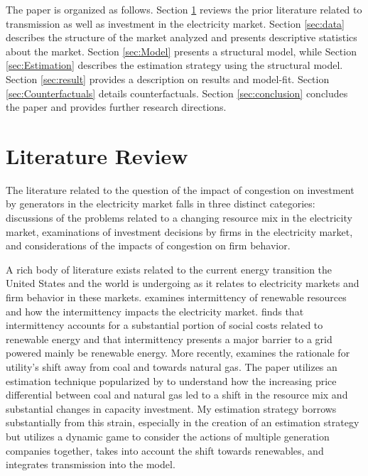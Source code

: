 \documentclass[12pt]{article}
\begin{document}
 The paper is organized as follows. Section \ref{sec:literature} reviews the prior literature related to transmission as well as investment in the electricity market. Section \ref{sec:data} describes the structure of the market analyzed and presents descriptive statistics about the market. Section \ref{sec:Model} presents a structural model, while Section \ref{sec:Estimation} describes the estimation strategy using the structural model. Section \ref{sec:result} provides a description on results and model-fit.  Section \ref{sec:Counterfactuals} details counterfactuals. Section \ref{sec:conclusion} concludes the paper and provides further research directions.

\section{Literature Review} \label{sec:literature}

The literature related to the question of the impact of congestion on investment by generators in the electricity market falls in three distinct categories: discussions of the problems related to a changing resource mix in the electricity market, examinations of investment decisions by firms in the electricity market, and considerations of the impacts of congestion on firm behavior. 

A rich body of literature exists related to the current energy transition the United States and the world is undergoing as it relates to electricity markets and firm behavior in these markets. \cite{gowrisankaran2016intermittency} examines intermittency of renewable resources and how the intermittency impacts the electricity market. \cite{gowrisankaran2016intermittency} finds that intermittency accounts for a substantial portion of social costs related to renewable energy and that intermittency presents a major barrier to a grid powered mainly be renewable energy. More recently, \cite{gowrisankaran2024energy} examines the rationale for utility's shift away from coal and towards natural gas. The paper utilizes an estimation technique popularized by \cite{gowrisankaran2024computable} to understand how the increasing price differential between coal and natural gas led to a shift in the resource mix and substantial changes in capacity investment. My estimation strategy borrows substantially from this strain, especially in the creation of an estimation strategy but utilizes a dynamic game to consider the actions of multiple generation companies together, takes into account the shift towards renewables, and integrates transmission into the model.
\end{document}
